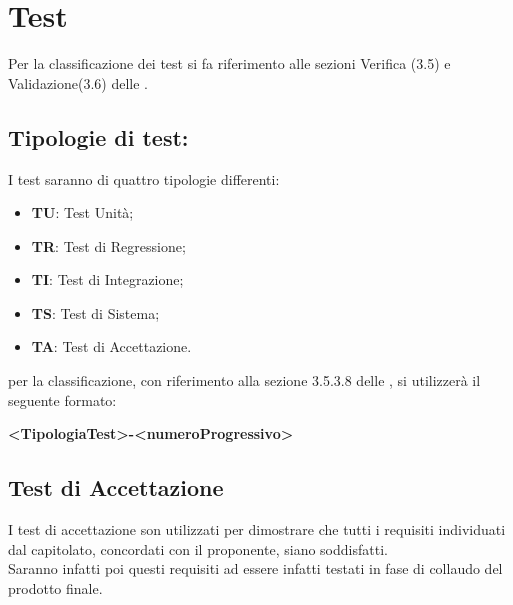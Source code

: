 \section{Test}
	Per la classificazione dei test si fa riferimento alle sezioni Verifica (3.5) e Validazione(3.6) delle .
	
	\subsection{Tipologie di test:}
		I test saranno di quattro tipologie differenti:
		\begin{itemize}
			\item \textbf{TU}: Test Unità;
			\item \textbf{TR}: Test di Regressione; 
			\item \textbf{TI}: Test di Integrazione; 
			\item \textbf{TS}: Test di Sistema;
			\item \textbf{TA}: Test di Accettazione.
		\end{itemize}
		per la classificazione, con riferimento alla sezione 3.5.3.8 delle , si utilizzerà il seguente formato:
		\begin{center}
			\textbf{<TipologiaTest>-<numeroProgressivo>}
		\end{center}
			
	\subsection{Test di Accettazione}
		I test di accettazione son utilizzati per dimostrare che tutti i requisiti individuati dal capitolato, concordati con il proponente, siano soddisfatti. \\
		Saranno infatti poi questi requisiti ad essere infatti testati in fase di collaudo del prodotto finale.
	\newpage
